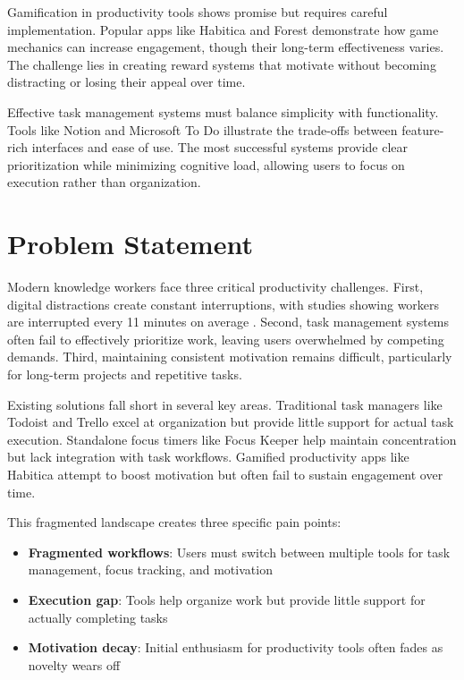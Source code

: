 \documentclass{article} %
\begin{document}
Gamification in productivity tools shows promise but requires careful implementation. Popular apps like Habitica and Forest demonstrate how game mechanics can increase engagement, though their long-term effectiveness varies. The challenge lies in creating reward systems that motivate without becoming distracting or losing their appeal over time.

Effective task management systems must balance simplicity with functionality. Tools like Notion and Microsoft To Do illustrate the trade-offs between feature-rich interfaces and ease of use. The most successful systems provide clear prioritization while minimizing cognitive load, allowing users to focus on execution rather than organization.

\section{Problem Statement}
\label{sec:problem}

Modern knowledge workers face three critical productivity challenges. First, digital distractions create constant interruptions, with studies showing workers are interrupted every 11 minutes on average \citep{lu2024aiscientist}. Second, task management systems often fail to effectively prioritize work, leaving users overwhelmed by competing demands. Third, maintaining consistent motivation remains difficult, particularly for long-term projects and repetitive tasks.

Existing solutions fall short in several key areas. Traditional task managers like Todoist and Trello excel at organization but provide little support for actual task execution. Standalone focus timers like Focus Keeper help maintain concentration but lack integration with task workflows. Gamified productivity apps like Habitica attempt to boost motivation but often fail to sustain engagement over time.

This fragmented landscape creates three specific pain points:
\begin{itemize}
    \item \textbf{Fragmented workflows}: Users must switch between multiple tools for task management, focus tracking, and motivation
    \item \textbf{Execution gap}: Tools help organize work but provide little support for actually completing tasks
    \item \textbf{Motivation decay}: Initial enthusiasm for productivity tools often fades as novelty wears off
\end{itemize}
\end{document}
